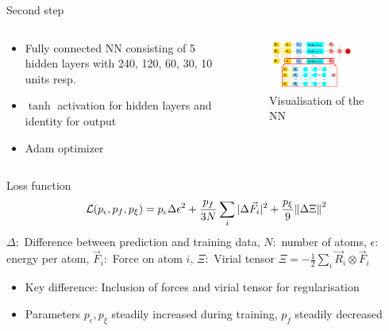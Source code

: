 \documentclass[aspectratio=169]{beamer}
\begin{document}
\begin{frame}{Second step}
\begin{columns}
	\begin{column}{0.5\textwidth}
\begin{itemize}
	\item<1-> Fully connected NN consisting of 5 hidden layers with 240, 120, 60, 30, 10 units resp.
	\item<2-> $\tanh $ activation for hidden layers and identity for output
	\item<3-> Adam optimizer 
\end{itemize}
\end{column}
\begin{column}{0.5\textwidth}
	\begin{figure}
		
		\centering
		\includegraphics[width=0.8\textwidth]{MD1}
		\caption{Visualisation of the NN \cite{PhysRevLett.120.143001}}
	\end{figure}
\end{column}
\end{columns}
\end{frame}
\begin{frame}{Loss function}
$$\mathcal L (p_\epsilon, p_f, p_\xi) = p_\epsilon \Delta \epsilon^2 + \frac{p_f}{3N} \sum_i |\Delta \vec F_i|^2 + \frac{p_\xi}{9} \norm{\Delta \Xi}^2$$
$\Delta:$ Difference between prediction and training data, $N:$ number of atoms, $\epsilon:$ energy per atom, $\vec F_i:$ Force on atom $i$, $\Xi:$ Virial tensor $\Xi = -\frac{1}{2} \sum_i \vec R_i \otimes \vec F_i$
\vspace{.3cm}
\begin{itemize}
	\item<2-> Key difference: Inclusion of forces and virial tensor for regularisation
	\item<3-> Parameters $p_\epsilon, p_\xi$ steadily increased during training, $p_f$ steadily decreased
\end{itemize}
\end{frame}
\end{document}
